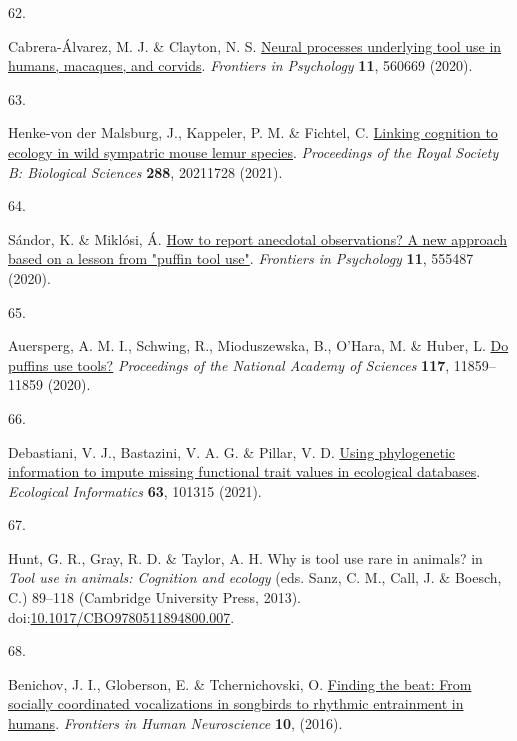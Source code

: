 \documentclass[
  man,floatsintext]{apa6}
\newlength{\cslhangindent}
\newlength{\csllabelwidth}
\newlength{\cslentryspacingunit} %
\newenvironment{CSLReferences}[2] %
 {%
  \setlength{\parindent}{0pt}
  \ifodd #1
  \let\oldpar\par
  \def\par{\hangindent=\cslhangindent\oldpar}
  \fi
  \setlength{\parskip}{#2\cslentryspacingunit}
 }%
 {}
\newcommand{\CSLLeftMargin}[1]{\parbox[t]{\csllabelwidth}{#1}}
\newcommand{\CSLRightInline}[1]{\parbox[t]{\linewidth - \csllabelwidth}{#1}\break}
\begin{document}
\begin{CSLReferences}{0}{0}
\leavevmode{}%
\CSLLeftMargin{62. }%
\CSLRightInline{Cabrera-Álvarez, M. J. \& Clayton, N. S. \href{https://doi.org/10.3389/fpsyg.2020.560669}{Neural processes underlying tool use in humans, macaques, and corvids}. \emph{Frontiers in Psychology} \textbf{11}, 560669 (2020).}

\leavevmode{}%
\CSLLeftMargin{63. }%
\CSLRightInline{Henke-von der Malsburg, J., Kappeler, P. M. \& Fichtel, C. \href{https://doi.org/10.1098/rspb.2021.1728}{Linking cognition to ecology in wild sympatric mouse lemur species}. \emph{Proceedings of the Royal Society B: Biological Sciences} \textbf{288}, 20211728 (2021).}

\leavevmode{}%
\CSLLeftMargin{64. }%
\CSLRightInline{Sándor, K. \& Miklósi, Á. \href{https://doi.org/10.3389/fpsyg.2020.555487}{How to report anecdotal observations? A new approach based on a lesson from "puffin tool use"}. \emph{Frontiers in Psychology} \textbf{11}, 555487 (2020).}

\leavevmode{}%
\CSLLeftMargin{65. }%
\CSLRightInline{Auersperg, A. M. I., Schwing, R., Mioduszewska, B., O'Hara, M. \& Huber, L. \href{https://doi.org/10.1073/pnas.2001988117}{Do puffins use tools?} \emph{Proceedings of the National Academy of Sciences} \textbf{117}, 11859--11859 (2020).}

\leavevmode{}%
\CSLLeftMargin{66. }%
\CSLRightInline{Debastiani, V. J., Bastazini, V. A. G. \& Pillar, V. D. \href{https://doi.org/10.1016/j.ecoinf.2021.101315}{Using phylogenetic information to impute missing functional trait values in ecological databases}. \emph{Ecological Informatics} \textbf{63}, 101315 (2021).}

\leavevmode{}%
\CSLLeftMargin{67. }%
\CSLRightInline{Hunt, G. R., Gray, R. D. \& Taylor, A. H. Why is tool use rare in animals? in \emph{Tool use in animals: Cognition and ecology} (eds. Sanz, C. M., Call, J. \& Boesch, C.) 89--118 (Cambridge University Press, 2013). doi:\href{https://doi.org/10.1017/CBO9780511894800.007}{10.1017/CBO9780511894800.007}.}

\leavevmode{}%
\CSLLeftMargin{68. }%
\CSLRightInline{Benichov, J. I., Globerson, E. \& Tchernichovski, O. \href{https://doi.org/10.3389/fnhum.2016.00255}{Finding the beat: From socially coordinated vocalizations in songbirds to rhythmic entrainment in humans}. \emph{Frontiers in Human Neuroscience} \textbf{10}, (2016).}


\end{CSLReferences}
\end{document}
